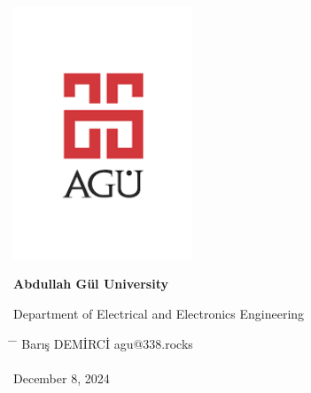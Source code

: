 \begin{center}
	\includegraphics[width=0.4\textwidth]{assets/agu.png}

	\Huge
	\textbf{Abdullah Gül University}
	
	\vspace{0.3cm}
	Department of Electrical and Electronics Engineering

	\vspace{1cm}
	\Huge
	\textbf{\paperTitle}

	\vspace{0.3cm}
	\Huge
	\paperSubTitle{}

	\vspace{0.8cm}
	\large
	\vspace{0.5cm}
	\LARGE
	\vspace{1.5cm}
	\textbf{}
	\vfill
	\vspace{0.8cm}
	\Large
\end{center}

\begin{tabbing}
	\hspace*{1em}\= \hspace*{8em} \= \kill
	\> Barış DEMİRCİ \> agu@338.rocks \\
	\> \> \\
	\> December 8, 2024 \> \\
\end{tabbing}

